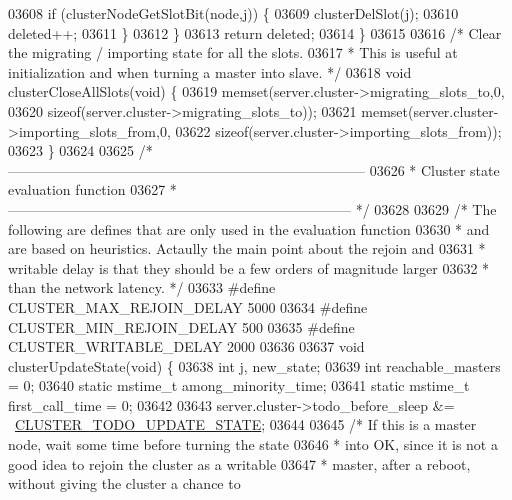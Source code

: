 \begin{DoxyCode}
{{{{{{{{{{{{{{{{{{{{{{{{{{{{{{{{{{{{{{{{{{{{{{{{{{{{{{{{{{{{{03608         \textcolor{keywordflow}{if} (clusterNodeGetSlotBit(node,j)) \{
03609             clusterDelSlot(j);
03610             deleted++;
03611         \}
03612     \}
03613     \textcolor{keywordflow}{return} deleted;
03614 \}
03615 
03616 \textcolor{comment}{/* Clear the migrating / importing state for all the slots.}
03617 \textcolor{comment}{ * This is useful at initialization and when turning a master into slave. */}
03618 \textcolor{keywordtype}{void} clusterCloseAllSlots(\textcolor{keywordtype}{void}) \{
03619     memset(server.cluster->migrating\_slots\_to,0,
03620         \textcolor{keyword}{sizeof}(server.cluster->migrating\_slots\_to));
03621     memset(server.cluster->importing\_slots\_from,0,
03622         \textcolor{keyword}{sizeof}(server.cluster->importing\_slots\_from));
03623 \}
03624 
03625 \textcolor{comment}{/* -----------------------------------------------------------------------------}
03626 \textcolor{comment}{ * Cluster state evaluation function}
03627 \textcolor{comment}{ * -------------------------------------------------------------------------- */}
03628 
03629 \textcolor{comment}{/* The following are defines that are only used in the evaluation function}
03630 \textcolor{comment}{ * and are based on heuristics. Actaully the main point about the rejoin and}
03631 \textcolor{comment}{ * writable delay is that they should be a few orders of magnitude larger}
03632 \textcolor{comment}{ * than the network latency. */}
03633 \textcolor{preprocessor}{#}\textcolor{preprocessor}{define} \textcolor{preprocessor}{CLUSTER\_MAX\_REJOIN\_DELAY} 5000
03634 \textcolor{preprocessor}{#}\textcolor{preprocessor}{define} \textcolor{preprocessor}{CLUSTER\_MIN\_REJOIN\_DELAY} 500
03635 \textcolor{preprocessor}{#}\textcolor{preprocessor}{define} \textcolor{preprocessor}{CLUSTER\_WRITABLE\_DELAY} 2000
03636 
03637 \textcolor{keywordtype}{void} clusterUpdateState(\textcolor{keywordtype}{void}) \{
03638     \textcolor{keywordtype}{int} j, new\_state;
03639     \textcolor{keywordtype}{int} reachable\_masters = 0;
03640     \textcolor{keyword}{static} mstime\_t among\_minority\_time;
03641     \textcolor{keyword}{static} mstime\_t first\_call\_time = 0;
03642 
03643     server.cluster->todo\_before\_sleep &= ~\hyperlink{cluster_8h_abea0d393cba342261e4a7e6fb745f388}{CLUSTER\_TODO\_UPDATE\_STATE};
03644 
03645     \textcolor{comment}{/* If this is a master node, wait some time before turning the state}
03646 \textcolor{comment}{     * into OK, since it is not a good idea to rejoin the cluster as a writable}
03647 \textcolor{comment}{     * master, after a reboot, without giving the cluster a chance to}
}}}}}}}}}}}}}}}}}}}}}}}}}}}}}}}}}}}}}}}}}}}}}}}}}}}}}}}}}}}}}
\end{DoxyCode}
